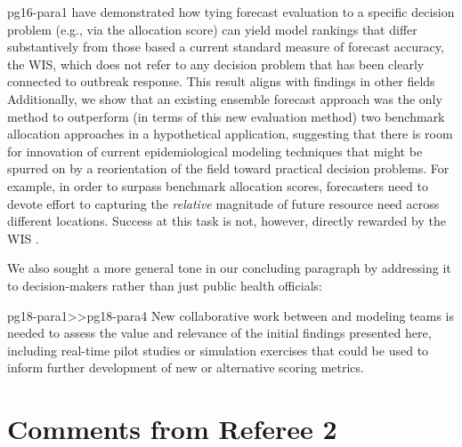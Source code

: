 \documentclass{article}
\begin{document}
\begin{mybox}{pg16-para1}
\DIFaddend have demonstrated how tying forecast evaluation to a specific decision problem (e.g., via the allocation
score) can yield model rankings that differ substantively from those based a current standard measure of forecast
accuracy, the WIS, which does not refer to any decision problem that has been clearly connected to outbreak response.
This result aligns with findings in other fields \DIFdelbegin {}\DIFdelend Additionally, we show that an existing
ensemble forecast approach was the only method to outperform (in terms of this new evaluation method) two benchmark
allocation approaches in a hypothetical application, suggesting that there is room for innovation of current
epidemiological modeling techniques that might be spurred on by a reorientation of the field toward practical decision
problems. For example, in order to surpass benchmark allocation scores, forecasters need to devote effort to capturing
the \emph{relative} magnitude of future resource need across different locations.  Success at this task is not, however,
directly rewarded by the WIS \DIFaddbegin {}\DIFaddend . 
\end{mybox}

We also sought a more general tone in our concluding paragraph by addressing it to decision-makers rather than just public health officials:

\begin{mybox}{pg18-para1>>pg18-para4}
New collaborative work between \DIFdelbegin {}\DIFdelend \DIFaddbegin {}\DIFaddend and modeling teams is
needed to assess the value and relevance of the initial findings presented here, including real-time pilot studies or
simulation exercises that could be used to inform further development of new or alternative scoring metrics.
\end{mybox}

\section*{Comments from Referee 2}
\end{document}
